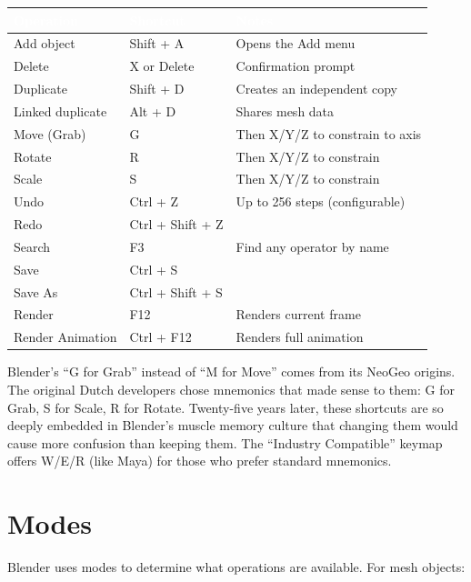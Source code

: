 \documentclass[11pt,letterpaper,twoside,openright]{book}
\newcommand{\tableheader}[1]{\textbf{\sffamily\textcolor{white}{#1}}}
\begin{document}
\begin{shortcutbox}
\begin{center}
\begin{tabularx}{\textwidth}{L{4cm}C{3cm}X}
\toprule
{}
\tableheader{Operation} & \tableheader{Shortcut} & \tableheader{Notes} \\
\midrule
Add object & Shift + A & Opens the Add menu \\
Delete & X or Delete & Confirmation prompt \\
Duplicate & Shift + D & Creates an independent copy \\
Linked duplicate & Alt + D & Shares mesh data \\
Move (Grab) & G & Then X/Y/Z to constrain to axis \\
Rotate & R & Then X/Y/Z to constrain \\
Scale & S & Then X/Y/Z to constrain \\
Undo & Ctrl + Z & Up to 256 steps (configurable) \\
Redo & Ctrl + Shift + Z & \\
Search & F3 & Find any operator by name \\
Save & Ctrl + S & \\
Save As & Ctrl + Shift + S & \\
Render & F12 & Renders current frame \\
Render Animation & Ctrl + F12 & Renders full animation \\
\bottomrule
\end{tabularx}
\end{center}
\end{shortcutbox}

\begin{historynote}
Blender's ``G for Grab'' instead of ``M for Move'' comes from its NeoGeo origins. The original Dutch developers chose mnemonics that made sense to them: G for Grab, S for Scale, R for Rotate. Twenty-five years later, these shortcuts are so deeply embedded in Blender's muscle memory culture that changing them would cause more confusion than keeping them. The ``Industry Compatible'' keymap offers W/E/R (like Maya) for those who prefer standard mnemonics.
\end{historynote}

\section{Modes}

Blender uses modes to determine what operations are available. For mesh objects:
\end{document}

